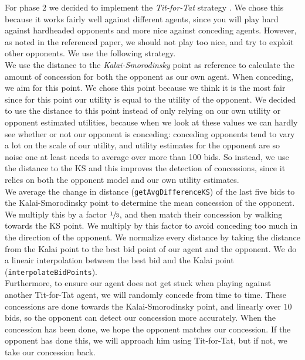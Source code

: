 For phase $2$ we decided to implement the \emph{Tit-for-Tat} strategy \cite{titfortat}.
We chose this because it works fairly well against different agents, since you will play
hard against hardheaded opponents and more nice against conceding agents.
However, as noted in the referenced paper, we should not play too nice,
and try to exploit other opponents. We use the following strategy. \\

We use the distance to the \emph{Kalai-Smorodinsky} point as reference to calculate
the amount of concession for both the opponent as our own agent. When conceding, we aim for this point. We chose this point because we think it is the most fair since for this point
our utility is equal to the utility of the opponent.
We decided to use the distance to this point instead of only relying on our own utility 
or opponent estimated utilities, because when we look at these values we can hardly see whether or not our opponent is conceding: conceding opponents tend to vary a lot on the scale of our utility,
and utility estimates for the opponent are so noise one at least needs to average over more than 100 bids. So instead, we use the distance to the KS and this improves the detection of concessions,
since it relies on both the opponent model and our own utility estimates. \\

We average the change in distance (\verb-getAvgDifferenceKS-) of the last five bids to the Kalai-Smorodinsky point to determine the mean concession of the opponent. We
multiply this by a factor $\sfrac{1}{3}$, and then match their concession by walking towards the KS point. We multiply by this factor to avoid conceding too much in the direction of the opponent. 
We normalize every distance by taking the distance from the Kalai point to the best bid point of our agent and the opponent. We do a lineair interpolation between the best bid and the 
Kalai point (\verb-interpolateBidPoints-).
\\

Furthermore, to ensure our agent does not get stuck when playing against 
another Tit-for-Tat agent, we will randomly concede from time to time. 
These concessions are done towards the Kalai-Smorodinsky point, and linearly over 
$10$ bids, so the opponent can detect our concession more accurately. When the concession has been done, we hope the opponent matches  our concession. If the opponent has done this, we will approach him using Tit-for-Tat, but if not, we take our concession back. \\

